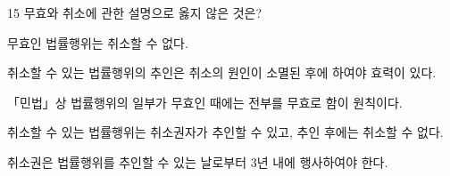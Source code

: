 \begin{question}{15}
무효와 취소에 관한 설명으로 옳지 않은 것은?
\begin{choices}
  \item 무효인 법률행위는 취소할 수 없다.
  \item 취소할 수 있는 법률행위의 추인은 취소의 원인이 소멸된 후에 하여야 효력이 있다.
  \item 「민법」상 법률행위의 일부가 무효인 때에는 전부를 무효로 함이 원칙이다.
  \item 취소할 수 있는 법률행위는 취소권자가 추인할 수 있고, 추인 후에는 취소할 수 없다.
  \item 취소권은 법률행위를 추인할 수 있는 날로부터 3년 내에 행사하여야 한다.
\end{choices}
\end{question}
